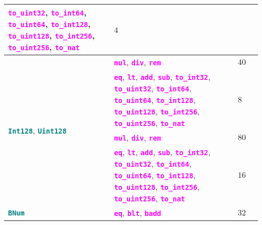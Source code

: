 \documentclass[10pt]{article}
\begin{document}
\begin{tabularx}{\linewidth}{|l|p{4.1cm}|p{4cm}|p{4cm}|}
		 \textbf{\texttt{\textcolor{magenta}{to\_uint32}}},
		 \textbf{\texttt{\textcolor{magenta}{to\_int64}}},
		 \textbf{\texttt{\textcolor{magenta}{to\_uint64}}},
		 \textbf{\texttt{\textcolor{magenta}{to\_int128}}},
		 \textbf{\texttt{\textcolor{magenta}{to\_uint128}}},
		 \textbf{\texttt{\textcolor{magenta}{to\_int256}}},
		 \textbf{\texttt{\textcolor{magenta}{to\_uint256}}},
		 \textbf{\texttt{\textcolor{magenta}{to\_nat}}}
		 & $4$  & \\ \hline \hline
		\multirow{4}{*}{\textbf{\texttt{\textcolor{teal}{Int128}}},
		\textbf{\texttt{\textcolor{teal}{Uint128}}}} &
		\textbf{\texttt{\textcolor{magenta}{mul}}},
		 \textbf{\texttt{\textcolor{magenta}{div}}},
		 \textbf{\texttt{\textcolor{magenta}{rem}}} &
		 $ 40 $  & \\ \cline{2-4}
		 & 
		 \textbf{\texttt{\textcolor{magenta}{eq}}},
		 \textbf{\texttt{\textcolor{magenta}{lt}}},
		 \textbf{\texttt{\textcolor{magenta}{add}}},
		 \textbf{\texttt{\textcolor{magenta}{sub}}},
		 \textbf{\texttt{\textcolor{magenta}{to\_int32}}},
		 \textbf{\texttt{\textcolor{magenta}{to\_uint32}}},
		 \textbf{\texttt{\textcolor{magenta}{to\_int64}}},
		 \textbf{\texttt{\textcolor{magenta}{to\_uint64}}},
		 \textbf{\texttt{\textcolor{magenta}{to\_int128}}},
		 \textbf{\texttt{\textcolor{magenta}{to\_uint128}}},
		 \textbf{\texttt{\textcolor{magenta}{to\_int256}}},
		 \textbf{\texttt{\textcolor{magenta}{to\_uint256}}},
		 \textbf{\texttt{\textcolor{magenta}{to\_nat}}}
		 & $8$  & \\ \hline \hline
		\multirow{4}{*}{\textbf{\texttt{\textcolor{teal}{Int256}}},
		\textbf{\texttt{\textcolor{teal}{Uint256}}}} &
		\textbf{\texttt{\textcolor{magenta}{mul}}},
		 \textbf{\texttt{\textcolor{magenta}{div}}},
		 \textbf{\texttt{\textcolor{magenta}{rem}}} &
		 $ 80 $  & \\ \cline{2-4}
		 &
		 \textbf{\texttt{\textcolor{magenta}{eq}}},
		 \textbf{\texttt{\textcolor{magenta}{lt}}},
		 \textbf{\texttt{\textcolor{magenta}{add}}},
		 \textbf{\texttt{\textcolor{magenta}{sub}}},
		 \textbf{\texttt{\textcolor{magenta}{to\_int32}}},
		 \textbf{\texttt{\textcolor{magenta}{to\_uint32}}},
		 \textbf{\texttt{\textcolor{magenta}{to\_int64}}},
		 \textbf{\texttt{\textcolor{magenta}{to\_uint64}}},
		 \textbf{\texttt{\textcolor{magenta}{to\_int128}}},
		 \textbf{\texttt{\textcolor{magenta}{to\_uint128}}},
		 \textbf{\texttt{\textcolor{magenta}{to\_int256}}},
		 \textbf{\texttt{\textcolor{magenta}{to\_uint256}}},
		 \textbf{\texttt{\textcolor{magenta}{to\_nat}}}
		 & $ 16 $  & \\ \hline \hline
		\textbf{\texttt{\textcolor{teal}{BNum}}} &
		\textbf{\texttt{\textcolor{magenta}{eq}}},
		\textbf{\texttt{\textcolor{magenta}{blt}}},
		\textbf{\texttt{\textcolor{magenta}{badd}}} & $32$  & \\ \hline 
\end{tabularx}
\end{document}
